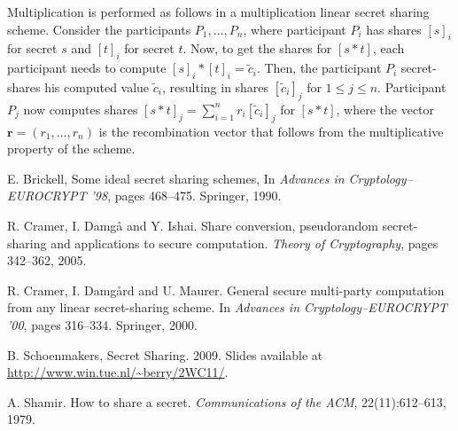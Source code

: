 \documentclass[11pt]{article}
\newcommand{\bfr}{\mathbf{r}}
\begin{document}
Multiplication is performed as follows in a multiplication linear secret sharing scheme. Consider the participants $P_1,\ldots,P_n$, where participant $P_i$ has shares $[s]_i$ for secret $s$ and $[t]_i$ for secret $t$. Now, to get the shares for $[s*t]$, each participant needs to compute $[s]_i * [t]_i = \tilde{c}_i$. Then, the participant $P_i$ secret-shares his computed value $\tilde{c}_i$, resulting in shares $[\tilde{c}_i]_j$ for $1\leq j\leq n$. Participant $P_j$ now computes shares $[s*t]_j = \sum_{i=1}^n r_i [\tilde{c}_i]_j$ for $[s*t]$, where the vector $\bfr = (r_1,\ldots,r_n)$ is the recombination vector that follows from the multiplicative property of the scheme. 

\begin{thebibliography}{99}
 E. Brickell, Some ideal secret sharing schemes, In {\it Advances in Cryptology--EUROCRYPT '98}, pages 468--475. Springer, 1990.

 R. Cramer, I. Damg{\aa} and Y. Ishai. Share conversion, pseudorandom secret-sharing and applications to secure computation. {\it Theory of Cryptography}, pages 342--362, 2005.

 R. Cramer, I. Damg{\aa}rd and U. Maurer. General secure multi-party computation from any linear secret-sharing scheme. In {\it Advances in Cryptology--EUROCRYPT '00}, pages 316--334. Springer, 2000.

 B. Schoenmakers, Secret Sharing. 2009. Slides available at \url{http://www.win.tue.nl/~berry/2WC11/}.

 A. Shamir. How to share a secret. {\it Communications of the ACM}, 22(11):612--613, 1979.
\end{thebibliography}

\end{document}
